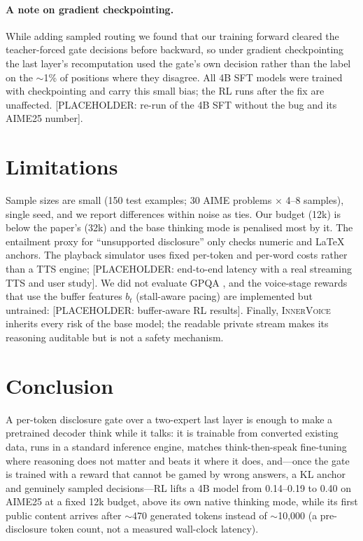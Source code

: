 \documentclass[letterpaper]{article} %
\newcommand{\placeholder}[1]{{\color{red}[PLACEHOLDER: #1]}}
\newcommand{\iv}{\textsc{InnerVoice}}
\begin{document}
\paragraph{A note on gradient checkpointing.} While adding sampled routing we found that our training forward cleared the teacher-forced gate decisions before backward, so under gradient checkpointing the last layer's recomputation used the gate's own decision rather than the label on the $\sim$1\% of positions where they disagree. All 4B SFT models were trained with checkpointing and carry this small bias; the RL runs after the fix are unaffected. \placeholder{re-run of the 4B SFT without the bug and its AIME25 number}.

\section{Limitations}
Sample sizes are small (150 test examples; 30 AIME problems $\times$ 4--8 samples), single seed, and we report differences within noise as ties. Our budget (12k) is below the paper's (32k) and the base thinking mode is penalised most by it. The entailment proxy for ``unsupported disclosure'' only checks numeric and LaTeX anchors. The playback simulator uses fixed per-token and per-word costs rather than a TTS engine; \placeholder{end-to-end latency with a real streaming TTS and user study}. We did not evaluate GPQA \citep[gated;][]{wei2026sxs}, and the voice-stage rewards that use the buffer features $b_t$ (stall-aware pacing) are implemented but untrained: \placeholder{buffer-aware RL results}. Finally, \iv{} inherits every risk of the base model; the readable private stream makes its reasoning auditable but is not a safety mechanism.

\section{Conclusion}
A per-token disclosure gate over a two-expert last layer is enough to make a pretrained decoder think while it talks: it is trainable from converted existing data, runs in a standard inference engine, matches think-then-speak fine-tuning where reasoning does not matter and beats it where it does, and---once the gate is trained with a reward that cannot be gamed by wrong answers, a KL anchor and genuinely sampled decisions---RL lifts a 4B model from 0.14--0.19 to 0.40 on AIME25 at a fixed 12k budget, above its own native thinking mode, while its first public content arrives after $\sim$470 generated tokens instead of $\sim$10,000 (a pre-disclosure token count, not a measured wall-clock latency).
\end{document}
